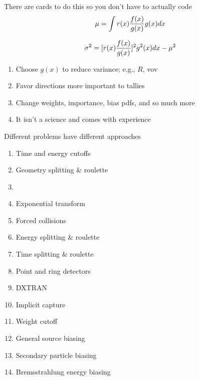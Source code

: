 \documentclass[aspectratio=1610,pdftex,dvipsnames,compress,xcolor={dvipsnames}]{beamer}
\newcommand{\acs}{\acrshort} %
\newcommand{\acsp}{\acrshortpl} %
\begin{document}
\begin{frame}{There are cards to do this so you don't have to actually code}
    \begin{equation}
        \LARGE
        \mu = \int r(x)\frac{f(x)}{g(x)}g(x)dx
    \end{equation}

    \vspace*{\fill}

    \begin{equation}
        \LARGE
        \sigma^2 = [r(x)\frac{f(x)}{g(x)}]^2g^2(x)dx - \mu^2
    \end{equation}

    \vspace*{\fill}

    \begin{enumerate}[series=outerlist,topsep=0pt,itemsep=21pt,leftmargin=*,label=(\arabic*)]
        \item[]Choose $g(x)$ to reduce variance; e.g., $R$, \acs{vov}
        \item[]Favor directions more important to tallies
        \item[]Change weights, importance, bias pdfs, and so much more
        \item[]It isn't a science and comes with experience
    \end{enumerate}
\end{frame}


\begin{frame}{Different problems have different approaches}
    \begin{enumerate}[series=techniques,topsep=0pt,itemsep=3pt,leftmargin=*,label=(\arabic*)]
        \item Time and energy cutoffs
        \item Geometry splitting \& roulette
        \item \acsp{wwg}
        \item Exponential transform
        \item Forced collisions
        \item Energy splitting \& roulette
        \item Time splitting \& roulette
        \item Point and ring detectors
        \item DXTRAN
        \item Implicit capture
        \item Weight cutoff
        \item General source biasing
        \item Secondary particle biasing
        \item Bremsstrahlung energy biasing
    \end{enumerate}
\end{frame}
\end{document}
